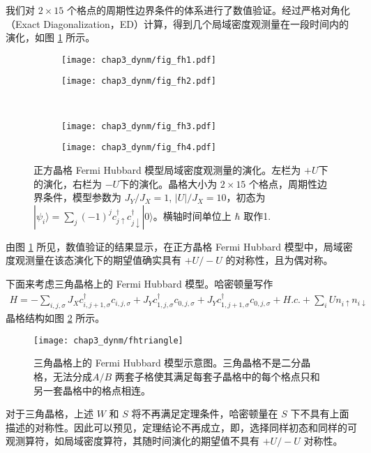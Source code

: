 我们对 $2\times15$ 个格点的周期性边界条件的体系进行了数值验证。经过严格对角化（Exact Diagonalization，ED）计算，得到几个局域密度观测量在一段时间内的演化，如图 \ref{fig:dynm:fhsed} 所示。
\begin{figure}[!htb]
\begin{subfigure}{.5\textwidth}
\texttt{[image: chap3\_dynm/fig\_fh1.pdf]}
\end{subfigure}
\begin{subfigure}{.5\textwidth}
\texttt{[image: chap3\_dynm/fig\_fh2.pdf]}
\end{subfigure}\\
\begin{subfigure}{.5\textwidth}
\texttt{[image: chap3\_dynm/fig\_fh3.pdf]}
\end{subfigure}
\begin{subfigure}{.5\textwidth}
\texttt{[image: chap3\_dynm/fig\_fh4.pdf]}
\end{subfigure}
\caption{正方晶格 Fermi Hubbard 模型局域密度观测量的演化。左栏为 $+U$下的演化，右栏为 $-U$下的演化。晶格大小为 $2\times15$ 个格点，周期性边界条件，模型参数为 $J_Y/J_X=1$, $|U|/J_X=10$，初态为 $|\psi_i\rangle=\sum_j (-1)^jc_{j\uparrow}^{\dagger}c_{j\downarrow}^{\dagger}|0\rangle$。横轴时间单位上 $\hbar$ 取作1.}
\label{fig:dynm:fhsed}
\end{figure}

由图 \ref{fig:dynm:fhsed} 所见，数值验证的结果显示，在正方晶格 Fermi Hubbard 模型中，局域密度观测量在该态演化下的期望值确实具有 $+U/-U$ 的对称性，且为偶对称。



下面来考虑三角晶格上的 Fermi Hubbard 模型。哈密顿量写作
\begin{align}
    H=-\sum_{i,j,\sigma}J_Xc_{i,j+1,\sigma}^{\dagger}c_{i,j,\sigma}+J_Yc_{1,j,\sigma}^{\dagger}c_{0,j,\sigma}+J_Yc_{1,j+1,\sigma}^{\dagger}c_{0,j,\sigma}+H.c.+\sum_iUn_{i\uparrow}n_{i\downarrow}
\end{align} 
晶格结构如图 \ref{fig:dynm:fhtriangle} 所示。
\begin{figure}[!htb]
\centering
\texttt{[image: chap3\_dynm/fhtriangle]}
\caption{三角晶格上的 Fermi Hubbard 模型示意图。三角晶格不是二分晶格，无法分成$A/B$ 两套子格使其满足每套子晶格中的每个格点只和另一套晶格中的格点相连。}
\label{fig:dynm:fhtriangle}
\end{figure}

对于三角晶格，上述 $W$ 和 $S$ 将不再满足定理条件，哈密顿量在 $S$ 下不具有上面描述的对称性。因此可以预见，定理结论不再成立，即，选择同样初态和同样的可观测算符，如局域密度算符，其随时间演化的期望值不具有 $+U/-U$ 对称性。

